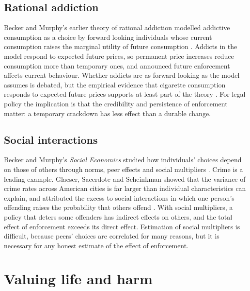 \subsection{Rational addiction}

Becker and Murphy's earlier theory of rational addiction modelled addictive consumption as a choice by forward looking individuals whose current consumption raises the marginal utility of future consumption \citep{becker1988}. Addicts in the model respond to expected future prices, so permanent price increases reduce consumption more than temporary ones, and announced future enforcement affects current behaviour. Whether addicts are as forward looking as the model assumes is debated, but the empirical evidence that cigarette consumption responds to expected future prices supports at least part of the theory \citep{becker1994}. For legal policy the implication is that the credibility and persistence of enforcement matter: a temporary crackdown has less effect than a durable change.

\subsection{Social interactions}

Becker and Murphy's \emph{Social Economics} studied how individuals' choices depend on those of others through norms, peer effects and social multipliers \citep{becker2000}. Crime is a leading example. Glaeser, Sacerdote and Scheinkman showed that the variance of crime rates across American cities is far larger than individual characteristics can explain, and attributed the excess to social interactions in which one person's offending raises the probability that others offend \citep{glaeser1996}. With social multipliers, a policy that deters some offenders has indirect effects on others, and the total effect of enforcement exceeds its direct effect. Estimation of social multipliers is difficult, because peers' choices are correlated for many reasons, but it is necessary for any honest estimate of the effect of enforcement.

\section{Valuing life and harm}

